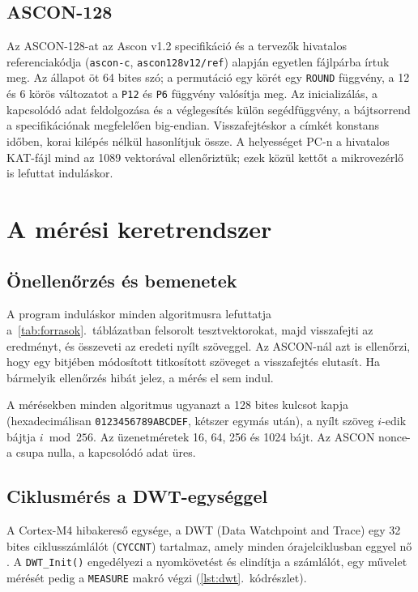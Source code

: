 \documentclass[a4paper,12pt]{report}
\theoremstyle{definition}
\theoremstyle{remark}
\begin{document}
\subsection{ASCON-128}

Az ASCON-128-at az Ascon v1.2 specifikáció \cite{Dobraunig2021} és a tervezők hivatalos referenciakódja (\texttt{ascon-c}, \texttt{ascon128v12/ref}) \cite{AsconC} alapján egyetlen fájlpárba írtuk meg. Az állapot öt 64 bites szó; a permutáció egy körét egy \texttt{ROUND} függvény, a 12 és 6 körös változatot a \texttt{P12} és \texttt{P6} függvény valósítja meg. Az inicializálás, a kapcsolódó adat feldolgozása és a véglegesítés külön segédfüggvény, a bájtsorrend a specifikációnak megfelelően big-endian. Visszafejtéskor a címkét konstans időben, korai kilépés nélkül hasonlítjuk össze. A helyességet PC-n a hivatalos KAT-fájl mind az 1089 vektorával ellenőriztük; ezek közül kettőt a mikrovezérlő is lefuttat induláskor.

\section{A mérési keretrendszer}\label{sec:keretrendszer}

\subsection{Önellenőrzés és bemenetek}

A program induláskor minden algoritmusra lefuttatja a~\ref{tab:forrasok}.~táblázatban felsorolt tesztvektorokat, majd visszafejti az eredményt, és összeveti az eredeti nyílt szöveggel. Az ASCON-nál azt is ellenőrzi, hogy egy bitjében módosított titkosított szöveget a visszafejtés elutasít. Ha bármelyik ellenőrzés hibát jelez, a mérés el sem indul.

A mérésekben minden algoritmus ugyanazt a 128 bites kulcsot kapja (hexadecimálisan \texttt{0123456789ABCDEF}, kétszer egymás után), a nyílt szöveg $i$-edik bájtja $i \bmod 256$. Az üzenetméretek 16, 64, 256 és 1024 bájt. Az ASCON nonce-a csupa nulla, a kapcsolódó adat üres.

\subsection{Ciklusmérés a DWT-egységgel}

A Cortex-M4 hibakereső egysége, a DWT (Data Watchpoint and Trace) egy 32 bites ciklusszámlálót (\texttt{CYCCNT}) tartalmaz, amely minden órajelciklusban eggyel nő \cite{ARMCM4}. A \texttt{DWT\_Init()} engedélyezi a nyomkövetést és elindítja a számlálót, egy művelet mérését pedig a \texttt{MEASURE} makró végzi (\ref{lst:dwt}.~kódrészlet).
\end{document}
